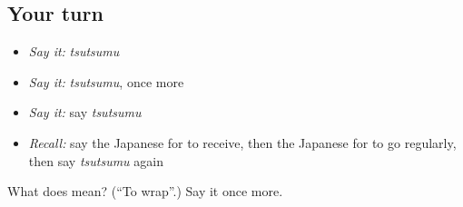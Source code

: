 \subsection*{Your turn}
\begin{itemize}
\raggedright
  \item \emph{Say it:} \emph{tsutsumu}
  \item \emph{Say it:} \emph{tsutsumu}, once more
  \item \emph{Say it:} say \emph{tsutsumu}
  \item \emph{Recall:} say the Japanese for to receive, then the Japanese for to go regularly, then say \emph{tsutsumu} again
\end{itemize}

\begin{tcolorbox}[breakable,colback=teal!4,colframe=teal!35!black,title={Before you move on}]
What does  mean? (\textquotedblleft{}To wrap\textquotedblright{}.) Say it once more.
\end{tcolorbox}
